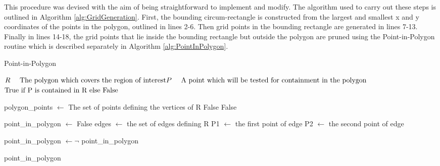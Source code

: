 This procedure was devised with the aim of being straightforward to implement and modify. The algorithm used to carry out these steps is outlined in Algorithm \ref{alg:GridGeneration}. First, the bounding circum-rectangle is constructed from the largest and smallest x and y coordinates of the points in the polygon, outlined in lines 2-6. Then grid points in the bounding rectangle are generated in lines 7-13. Finally in lines 14-18, the grid points that lie inside the bounding rectangle but outside the polygon are pruned using the Point-in-Polygon routine which is described separately in Algorithm \ref{alg:PointInPolygon}. 


\begin{algorithm}{}
\caption{Point-in-Polygon}
\label{alg:PointInPolygon}
\begin{algorithmic}[1]
\renewcommand{\algorithmicrequire}{\textbf{Input:}}
\renewcommand{\algorithmicensure}{\textbf{Output:}}
\REQUIRE $ \newline R \quad \text{ The polygon which covers the region of interest}
\newline P \quad \text{ A point which will be tested for containment in the polygon }
$
\ENSURE $\newline \text{True if P is contained in R else False }$

\hfill\pagebreak
\STATE polygon\_points $\leftarrow$ The set of points defining the vertices of R
\RETURN False
\RETURN False



\ELSE
\STATE point\_in\_polygon $\leftarrow$ False
\STATE edges $\leftarrow$ the set of edges defining R
\STATE P1 $\leftarrow$ the first point of edge
\STATE P2 $\leftarrow$ the second point of edge

\STATE point\_in\_polygon $\leftarrow \neg$ point\_in\_polygon
\ENDIF

\ENDFOR
\ENDIF
\RETURN point\_in\_polygon
\end{algorithmic} 
\end{algorithm}


